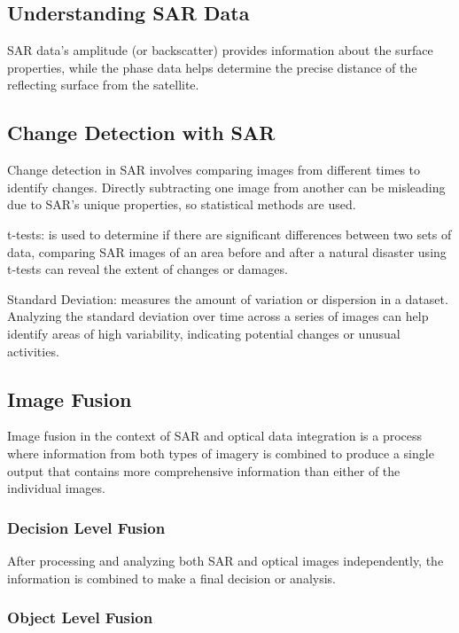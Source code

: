 \documentclass[
  letterpaper,
  DIV=11,
  numbers=noendperiod]{scrreprt}
\begin{document}
\subsection{Understanding SAR Data}\label{understanding-sar-data}

SAR data's amplitude (or backscatter) provides information about the
surface properties, while the phase data helps determine the precise
distance of the reflecting surface from the satellite.

\subsection{Change Detection with SAR}\label{change-detection-with-sar}

Change detection in SAR involves comparing images from different times
to identify changes. Directly subtracting one image from another can be
misleading due to SAR's unique properties, so statistical methods are
used.

t-tests: is used to determine if there are significant differences
between two sets of data, comparing SAR images of an area before and
after a natural disaster using t-tests can reveal the extent of changes
or damages.

Standard Deviation: measures the amount of variation or dispersion in a
dataset. Analyzing the standard deviation over time across a series of
images can help identify areas of high variability, indicating potential
changes or unusual activities.

\subsection{Image Fusion}\label{image-fusion}

Image fusion in the context of SAR and optical data integration is a
process where information from both types of imagery is combined to
produce a single output that contains more comprehensive information
than either of the individual images.

\subsubsection{Decision Level Fusion}\label{decision-level-fusion}

After processing and analyzing both SAR and optical images
independently, the information is combined to make a final decision or
analysis.

\subsubsection{Object Level Fusion}\label{object-level-fusion}
\end{document}
